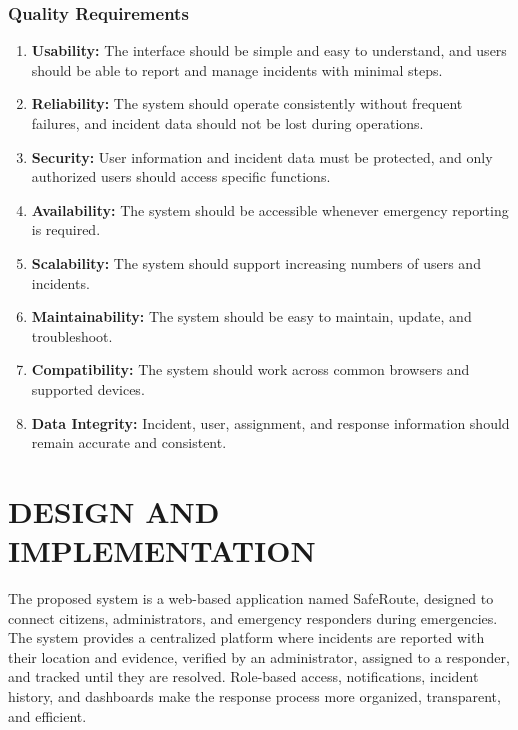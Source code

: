 \documentclass[a4paper,12pt]{report}
\begin{document}
	\subsection{Quality Requirements}
	
	\begin{enumerate}
		\item \textbf{Usability:}
		The interface should be simple and easy to understand, and users should be able to report and manage incidents with minimal steps.
		
		\item \textbf{Reliability:}
		The system should operate consistently without frequent failures, and incident data should not be lost during operations.
		
		\item \textbf{Security:}
		User information and incident data must be protected, and only authorized users should access specific functions.
		
		\item \textbf{Availability:}
		The system should be accessible whenever emergency reporting is required.
		
		\item \textbf{Scalability:}
		The system should support increasing numbers of users and incidents.
		
		\item \textbf{Maintainability:}
		The system should be easy to maintain, update, and troubleshoot.
		
		\item \textbf{Compatibility:}
		The system should work across common browsers and supported devices.
		
		\item \textbf{Data Integrity:}
		Incident, user, assignment, and response information should remain accurate and consistent.
	\end{enumerate}
	
	\chapter{DESIGN AND IMPLEMENTATION}
	
	The proposed system is a web-based application named SafeRoute, designed to connect citizens, administrators, and emergency responders during emergencies. The system provides a centralized platform where incidents are reported with their location and evidence, verified by an administrator, assigned to a responder, and tracked until they are resolved. Role-based access, notifications, incident history, and dashboards make the response process more organized, transparent, and efficient.
	
\end{document}
